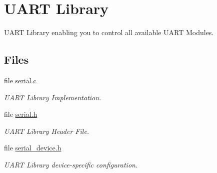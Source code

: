 \hypertarget{group__uart}{\section{U\-A\-R\-T Library}
\label{group__uart}
}


U\-A\-R\-T Library enabling you to control all available U\-A\-R\-T Modules.  


\subsection*{Files}
\begin{DoxyCompactItemize}
\item 
file \hyperlink{serial_8c}{serial.\-c}
\begin{DoxyCompactList}\small\item\em U\-A\-R\-T Library Implementation. \end{DoxyCompactList}\item 
file \hyperlink{serial_8h}{serial.\-h}
\begin{DoxyCompactList}\small\item\em U\-A\-R\-T Library Header File. \end{DoxyCompactList}\item 
file \hyperlink{serial__device_8h}{serial\-\_\-device.\-h}
\begin{DoxyCompactList}\small\item\em U\-A\-R\-T Library device-\/specific configuration. \end{DoxyCompactList}\end{DoxyCompactItemize}
